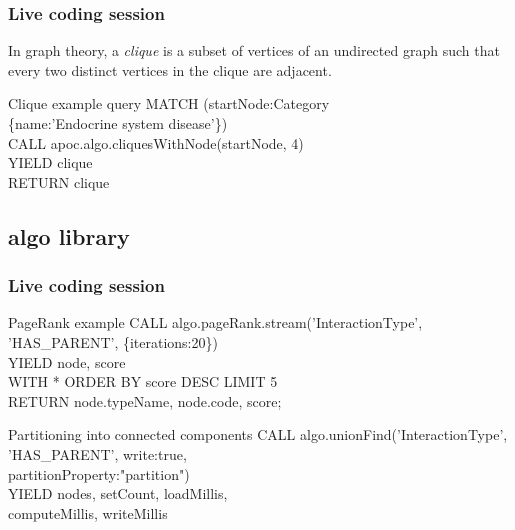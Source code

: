 \documentclass[12pt]{beamer}
\begin{document}
    \begin{frame}
        \frametitle{Live coding session}
        \begin{Definition}
            In graph theory, a \emph{clique} is a subset of vertices of an undirected graph such that every two distinct vertices in the clique are adjacent.
        \end{Definition}
        \begin{block}{Clique example query}
        MATCH (startNode:Category\\
        \hspace{3cm} \{name:'Endocrine system disease'\})\\
        \hspace{1cm} CALL apoc.algo.cliquesWithNode(startNode, 4)\\
        \hspace{1cm} YIELD clique\\
        RETURN clique
        \end{block}
    \end{frame}
    
    \subsection{algo library}
    \begin{frame}
        \frametitle{Live coding session}
        \begin{block}{PageRank example}
            CALL algo.pageRank.stream('InteractionType',\\
            \hspace{1cm} 'HAS\_PARENT', \{iterations:20\})\\
            \hspace{1cm} YIELD node, score\\
            WITH * ORDER BY score DESC LIMIT 5\\
            RETURN node.typeName, node.code, score;
        \end{block}
        \begin{block}{Partitioning into connected components}
            CALL algo.unionFind('InteractionType',\\
            \hspace{2cm} 'HAS\_PARENT', {write:true,\\
            \hspace{2cm} partitionProperty:"partition"})\\
            YIELD nodes, setCount, loadMillis,\\
            \hspace{2cm} computeMillis, writeMillis
        \end{block}
    \end{frame}
    
\end{document}
